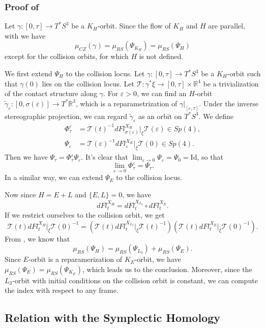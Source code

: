 \documentclass{amsart}
\newcommand{\R}{\mathbb{R}}
\newcommand{\Id}{\mathrm{Id}}
\newcommand{\g}{\gamma}
\newcommand{\eps}{\varepsilon}
\begin{document}
\subsubsection*{Proof of }\label{Subsubsection - Justifying}

Let $\g:[0,\tau]\to T^*S^3$ be a $K_H$-orbit.
Since the flow of $K_H$ and $H$ are parallel, with  we have
$$
\mu_{CZ}(\g) = \mu_{RS}(\Psi_{K_H}) = \mu_{RS}(\Psi_H)
$$
except for the collision orbits, for which $H$ is not defined.

We first extend $\Psi_H$ to the collision locus.
Let $\g:[0,\tau]\to T^*S^3$ be a $K_H$-orbit such that $\g(0)$ lies on the collision locus.
Let $\mathcal{T}:\g^*\xi\to [0,\tau]\times \R^4$ be a trivialization of the contact structure along $\g$.
For $\eps>0$, we can find an $H$-orbit $\tilde{\g}_\eps:[0,\sigma(\eps)]\to T^*\R^3$, which is a reparametrization of $\g|_{[\eps,\tau]}$.
Under the inverse stereographic projection, we can regard $\tilde{\g}_\eps$ as an orbit on $T^* S^3$.
We define
$$\begin{aligned}
	\Phi^\eps_\tau &= \mathcal{T}(t)^{-1}dFl^{X_H}_{\sigma(\eps)}|_{\xi}\mathcal{T}(\eps) \in Sp(4),\\
	\Psi_\eps &= \mathcal{T}(\eps)^{-1}dFl^{X_K}_\eps|_\xi \mathcal{T}(0) \in Sp(4).
\end{aligned}
$$
Then we have $\Psi_\tau = \Phi^\eps_\tau \Psi_\eps$.
It's clear that $\lim_{\eps\to0}\Psi_\eps =\Psi_0=\Id$, so that
$$
\lim_{\eps\to0} \Phi^\eps_\tau = \Psi_\tau.
$$
In a similar way, we can extend $\Psi_E$ to the collision locus.

Now since $H=E+L$ and $\{E,L\}=0$, we have
$$
dFl^{X_H}_t = dFl^{X_{L_3}}_t \circ dFl^{X_E}_t.
$$
If we restrict ourselves to the collision orbit, we get
$$
\mathcal{T}(t)dFl^{X_H}_t|_\xi \mathcal{T}(0)^{-1} = \left( \mathcal{T}(t) dFl^{X_{L_3}}_t|_\xi \mathcal{T}(t)^{-1}\right) \left( \mathcal{T}(t) dFl^{X_E}_t|_\xi \mathcal{T}(0)^{-1}\right).
$$
From , we know that
$$
\mu_{RS}(\Psi_H) = \mu_{RS}(\Psi_{L_3}) + \mu_{RS}(\Psi_E).
$$
Since $E$-orbit is a reparamerization of $K_E$-orbit, we have $\mu_{RS}(\Psi_E) = \mu_{RS}(\Psi_{K_E})$, which leads us to the conclusion.
Moreover, since the $L_3$-orbit with initial conditions on the collision orbit is constant, we can compute the index with respect to any frame.


\subsection{Relation with the Symplectic Homology}\label{Subsection - Relation with SH}
\end{document}
